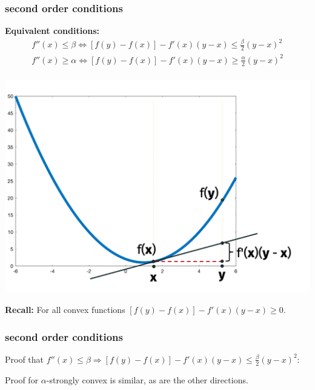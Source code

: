 \documentclass[compress]{beamer}
\begin{document}
\begin{frame}[t]
	\frametitle{second order conditions}
	\textbf{Equivalent conditions:}
	\begin{align*}
		f''(x) \leq \beta \iff [f(y) - f(x)] - f'(x)(y-x) \leq \frac{\beta}{2}(y-x)^2 \\
		f''(x) \geq \alpha \iff [f(y) - f(x)] - f'(x)(y-x) \geq \frac{\alpha}{2}(y-x)^2 \\
	\end{align*}
	\vspace{-4.5em}

	\begin{center}
		\includegraphics[width=.6\textwidth]{first_second_cond.png}

		\textbf{Recall:} For all convex functions $[f(y) - f(x)] - f'(x)(y-x) \geq 0$. 
	\end{center}
 \end{frame}

 \begin{frame}[t]
	\frametitle{second order conditions}
	Proof that $f''(x)\leq \beta \Rightarrow [f(y) - f(x)] - f'(x)(y-x) \leq \frac{\beta}{2}(y-x)^2$:

	\vspace{15em} Proof for $\alpha$-strongly convex is similar, as are the other directions. 
 \end{frame}
\end{document}
